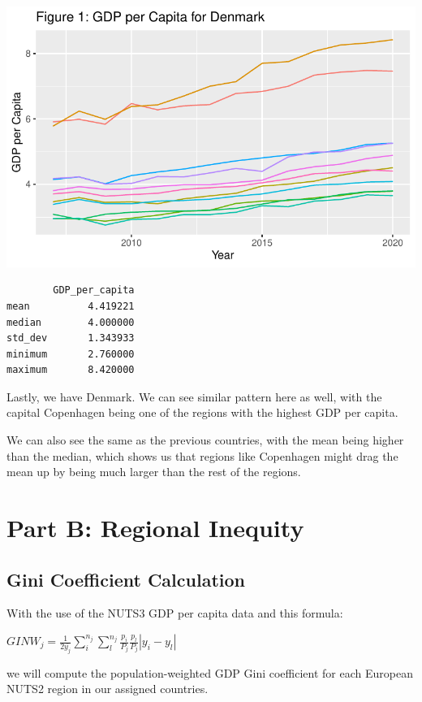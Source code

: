 \documentclass[
  a4paper,
  DIV=11,
  numbers=noendperiod]{scrartcl}
\begin{document}
\includegraphics{assignment_1_files/figure-pdf/unnamed-chunk-19-1.pdf}

\begin{verbatim}
        GDP_per_capita
mean          4.419221
median        4.000000
std_dev       1.343933
minimum       2.760000
maximum       8.420000
\end{verbatim}

Lastly, we have Denmark. We can see similar pattern here as well, with
the capital Copenhagen being one of the regions with the highest GDP per
capita.

We can also see the same as the previous countries, with the mean being
higher than the median, which shows us that regions like Copenhagen
might drag the mean up by being much larger than the rest of the
regions.

\hypertarget{part-b-regional-inequity}{%
\section{Part B: Regional Inequity}\label{part-b-regional-inequity}}

\hypertarget{gini-coefficient-calculation}{%
\subsection{Gini Coefficient
Calculation}\label{gini-coefficient-calculation}}

With the use of the NUTS3 GDP per capita data and this formula:

\(GINW_j=\frac{1}{2 \bar{y_j}} \sum_{i}^{n_j}\sum_{l}^{n_j}\frac{p_i}{P_j} \frac{p_l}{P_j} |y_i-y_l|\)

we will compute the population-weighted GDP Gini coefficient for each
European NUTS2 region in our assigned countries.
\end{document}
